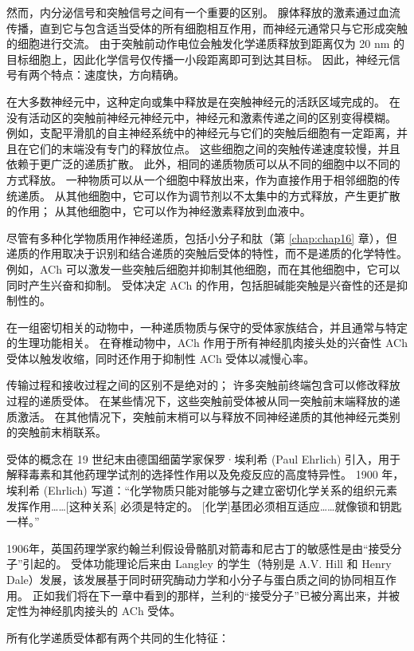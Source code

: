 然而，内分泌信号和突触信号之间有一个重要的区别。 
腺体释放的激素通过血流传播，直到它与包含适当受体的所有细胞相互作用，而神经元通常只与它形成突触的细胞进行交流。 
由于突触前动作电位会触发化学递质释放到距离仅为 20 nm 的目标细胞上，因此化学信号仅传播一小段距离即可到达其目标。 
因此，神经元信号有两个特点：速度快，方向精确。


在大多数神经元中，这种定向或集中释放是在突触神经元的活跃区域完成的。 
在没有活动区的突触前神经元神经元中，神经元和激素传递之间的区别变得模糊。 
例如，支配平滑肌的自主神经系统中的神经元与它们的突触后细胞有一定距离，并且在它们的末端没有专门的释放位点。 
这些细胞之间的突触传递速度较慢，并且依赖于更广泛的递质扩散。 
此外，相同的递质物质可以从不同的细胞中以不同的方式释放。 
一种物质可以从一个细胞中释放出来，作为直接作用于相邻细胞的传统递质。 
从其他细胞中，它可以作为调节剂以不太集中的方式释放，产生更扩散的作用； 
从其他细胞中，它可以作为神经激素释放到血液中。


尽管有多种化学物质用作神经递质，包括小分子和肽（第 \ref{chap:chap16} 章），但递质的作用取决于识别和结合递质的突触后受体的特性，而不是递质的化学特性。 
例如，ACh 可以激发一些突触后细胞并抑制其他细胞，而在其他细胞中，它可以同时产生兴奋和抑制。 
受体决定 ACh 的作用，包括胆碱能突触是兴奋性的还是抑制性的。


在一组密切相关的动物中，一种递质物质与保守的受体家族结合，并且通常与特定的生理功能相关。 
在脊椎动物中，ACh 作用于所有神经肌肉接头处的兴奋性 ACh 受体以触发收缩，同时还作用于抑制性 ACh 受体以减慢心率。


传输过程和接收过程之间的区别不是绝对的； 许多突触前终端包含可以修改释放过程的递质受体。 
在某些情况下，这些突触前受体被从同一突触前末端释放的递质激活。 
在其他情况下，突触前末梢可以与释放不同神经递质的其他神经元类别的突触前末梢联系。


受体的概念在 19 世纪末由德国细菌学家保罗·埃利希 (Paul Ehrlich) 引入，用于解释毒素和其他药理学试剂的选择性作用以及免疫反应的高度特异性。 
1900 年，埃利希 (Ehrlich) 写道：“化学物质只能对能够与之建立密切化学关系的组织元素发挥作用……[这种关系] 必须是特定的。 
[化学]基团必须相互适应……就像锁和钥匙一样。”


1906年，英国药理学家约翰兰利假设骨骼肌对箭毒和尼古丁的敏感性是由“接受分子”引起的。 
受体功能理论后来由 Langley 的学生（特别是 A.V. Hill 和 Henry Dale）发展，该发展基于同时研究酶动力学和小分子与蛋白质之间的协同相互作用。 
正如我们将在下一章中看到的那样，兰利的“接受分子”已被分离出来，并被定性为神经肌肉接头的 ACh 受体。


所有化学递质受体都有两个共同的生化特征：

